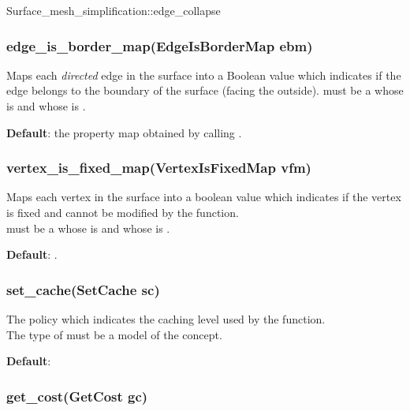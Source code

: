 \begin{ccRefFunction}{Surface_mesh_simplification::edge_collapse}
\subsubsection*{edge\_is\_border\_map(EdgeIsBorderMap ebm)} 

Maps each {\em directed} edge in the surface into a Boolean value
which indicates if the edge belongs to the boundary of the surface
(facing the outside).
 must be a 
whose  is
and whose  is .

\textbf{Default}: the property map obtained by calling .


\subsubsection*{vertex\_is\_fixed\_map(VertexIsFixedMap vfm)}


Maps each vertex in the surface into a boolean value
which indicates if the vertex is fixed and cannot be modified 
by the  function.\\
 must be a 
whose  is
and whose  is .

\textbf{Default}: 
.


\subsubsection*{set\_cache(SetCache sc)} 

The policy which indicates the caching level used 
by the  function.\\
The type of  must be a model of the  concept.

\textbf{Default}: 


\subsubsection*{get\_cost(GetCost gc)}



\end{ccRefFunction}
